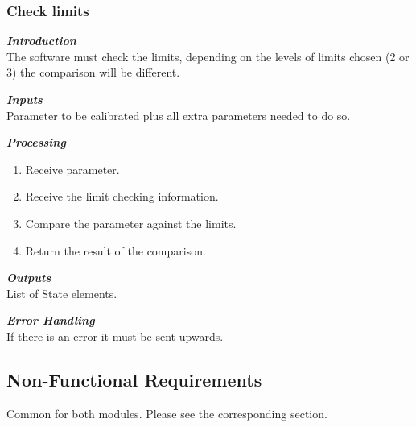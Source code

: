 \subsubsection{Check limits}

\textbf{\emph{Introduction}}\\

The software must check the limits, depending on the levels of limits chosen (2 or 3) the comparison will be different.


\textbf{\emph{Inputs}}\\

Parameter to be calibrated plus all extra parameters needed to do so.

\textbf{\emph{Processing}}\\
\begin{enumerate}
\item Receive parameter.
\item Receive the limit checking information.
\item Compare the parameter against the limits.
\item Return the result of the comparison.
\end{enumerate}

\textbf{\emph{Outputs}}\\
List of State elements.


\textbf{\emph{Error Handling}}\\
If there is an error it must be sent upwards.


\subsection{Non-Functional Requirements}

Common for both modules. Please see the corresponding section.



\newpage

